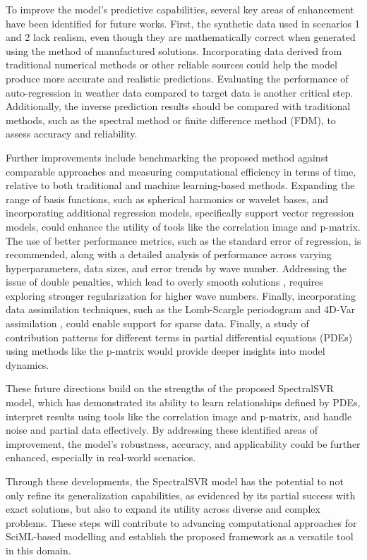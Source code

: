\documentclass[preprint,12pt,times,authoryear]{elsarticle}
\begin{document}
To improve the model's predictive capabilities, several key areas of enhancement have been identified for future works. First, the synthetic data used in scenarios 1 and 2 lack realism, even though they are mathematically correct when generated using the method of manufactured solutions. Incorporating data derived from traditional numerical methods or other reliable sources could help the model produce more accurate and realistic predictions. Evaluating the performance of auto-regression in weather data compared to target data is another critical step. Additionally, the inverse prediction results should be compared with traditional methods, such as the spectral method or finite difference method (FDM), to assess accuracy and reliability.

Further improvements include benchmarking the proposed method against comparable approaches and measuring computational efficiency in terms of time, relative to both traditional and machine learning-based methods. Expanding the range of basis functions, such as spherical harmonics or wavelet bases, and incorporating additional regression models, specifically support vector regression models, could enhance the utility of tools like the correlation image and p-matrix. The use of better performance metrics, such as the standard error of regression, is recommended, along with a detailed analysis of performance across varying hyperparameters, data sizes, and error trends by wave number. Addressing the issue of double penalties, which lead to overly smooth solutions \citep{brownForecastsSpatialFields2011,NIPS2017_44a2e080}, requires exploring stronger regularization for higher wave numbers. Finally, incorporating data assimilation techniques, such as the Lomb-Scargle periodogram \citep{vanderplasUnderstandingLombScargle2018} and 4D-Var assimilation \citep{puNumericalWeatherPrediction2018,parkDataAssimilationAtmospheric2013}, could enable support for sparse data. Finally, a study of contribution patterns for different terms in partial differential equations (PDEs) using methods like the p-matrix would provide deeper insights into model dynamics.

These future directions build on the strengths of the proposed SpectralSVR model, which has demonstrated its ability to learn relationships defined by PDEs, interpret results using tools like the correlation image and p-matrix, and handle noise and partial data effectively. By addressing these identified areas of improvement, the model's robustness, accuracy, and applicability could be further enhanced, especially in real-world scenarios.

Through these developments, the SpectralSVR model has the potential to not only refine its generalization capabilities, as evidenced by its partial success with exact solutions, but also to expand its utility across diverse and complex problems. These steps will contribute to advancing computational approaches for SciML-based modelling and establish the proposed framework as a versatile tool in this domain.





\end{document}
